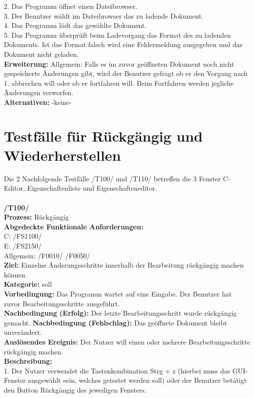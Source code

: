 \documentclass[a4paper]{scrreprt}
\begin{document}
2. Das Programm öffnet einen Dateibrowser.\\
3. Der Benutzer wählt im Dateibrowser das zu ladende Dokument. \\
4. Das Programm lädt das gewählte Dokument. \\
5. Das Programm überprüft beim Ladevorgang das Format des zu ladenden Dokuments. Ist das Format falsch wird eine Fehlermeldung ausgegeben und das Dokument nicht geladen. \\
\textbf {Erweiterung:} Allgemein: Falls es im zuvor geöffneten Dokument noch nicht gespeicherte Änderungen gibt, wird der Benutzer gefragt ob er den Vorgang nach 1. abbrechen will oder ob er fortfahren will. Beim Fortfahren werden jegliche Änderungen verworfen. \\
\textbf {Alternativen:} -keine- 
\section{Testfälle für Rückgängig und Wiederherstellen}
Die 2 Nachfolgende Testfälle /T100/ und /T110/ betreffen die 3 Fenster C-Editor, Eigenschaftenliste und Eigenschafteneditor. \\\\
\textbf{/T100/} \\ 
\textbf{Prozess: }Rückgängig \\
\textbf{Abgedeckte Funktionale Anforderungen:}\\
C: /FS1100/ \\
E: /FS2150/ \\
Allgemein: /F0010/ /F0050/ \\
\textbf{Ziel:} Einzelne Änderungsschritte innerhalb der Bearbeitung rückgängig machen können.\\
\textbf{Kategorie:} soll\\
\textbf{Vorbedingung:} Das Programm wartet auf eine Eingabe. Der Benutzer hat zuvor Bearbeitungsschritte ausgeführt. \\
\textbf{Nachbedingung (Erfolg):} Der letzte Bearbeitungsschritt wurde rückgängig gemacht.
\textbf{Nachbedingung (Fehlschlag):} Das geöffnete Dokument bleibt unverändert.\\
\textbf{Auslösendes Ereignis:} Der Nutzer will einen oder mehrere Bearbeitungsschritte rückgängig machen.\\
\textbf{Beschreibung:} \\
1. Der Nutzer verwendet die Tastenkombination Strg + z (hierbei muss das GUI-Fenster ausgewählt sein, welches getestet werden soll) oder der Benutzer betätigt den Button Rückgängig des jeweiligen Fensters.\\
\end{document}
